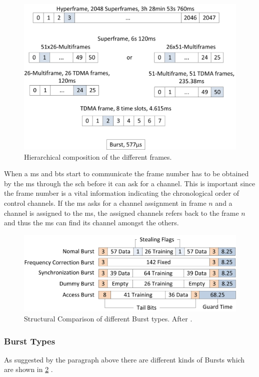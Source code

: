 \begin{figure}
	\centering
	\includegraphics{../Images/Frames}
	\caption{Hierarchical composition of the different frames.}
	\label{fig:frame_hierarchy}
\end{figure}

When a \gls{ms} and \gls{bts} start to communicate the frame number has to be obtained by the \gls{ms} through the \gls{sch} before it can ask for a channel.
This is important since the frame number is a vital information indicating the chronological order of control channels.
If the \gls{ms} asks for a channel assignment in frame $n$ and a channel is assigned to the \gls{ms}, the assigned channels refers back to the frame $n$ and thus the \gls{ms} can find its channel amongst the others.

\begin{figure}
	\centering
	\includegraphics{../Images/Bursts}
	\caption{Structural Comparison of different Burst types. After \cite{GSM2009}.}
	\label{fig:burst_types}
\end{figure}

\subsubsection{Burst Types}
As suggested by the paragraph above there are different kinds of Bursts which are shown in \ref{fig:burst_types} \cite{GSM2009}.

